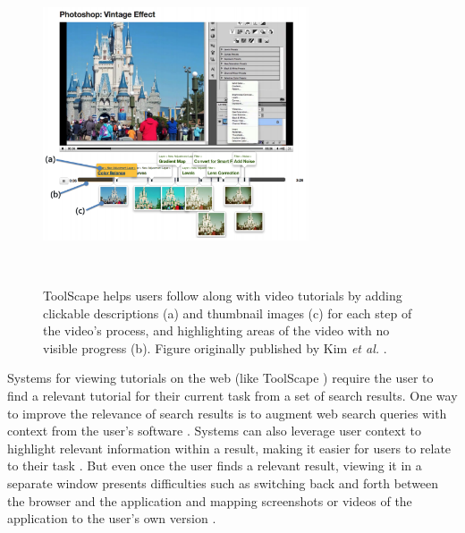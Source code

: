 \begin{figure}[t!]
\centering
  \includegraphics[width=0.7\textwidth]{figures/toolscape.png}
  \caption{ToolScape helps users follow along with video tutorials by adding clickable descriptions (a) and thumbnail images (c) for each step of the video’s process, and highlighting areas of the video with no visible progress (b). Figure originally published by Kim \textit{et al.} \cite{Kim2014}.}~\label{fig:intro_toolscape}
\end{figure}

Systems for viewing tutorials on the web (like ToolScape \cite{Kim2014, Kim2013}) require the user to find a relevant tutorial for their current task from a set of search results. One way to improve the relevance of search results is to augment web search queries with context from the user's software \cite{Ekstrand2011, Brandt2010, Matejka2011a}. Systems can also leverage user context to highlight relevant information within a result, making it easier for users to relate to their task \cite{Ekstrand2011, Fourney2014Intertwine}. But even once the user finds a relevant result, viewing it in a separate window presents difficulties such as switching back and forth between the browser and the application and mapping screenshots or videos of the application to the user's own version \cite{Kelleher2005, Pongnumkul2011}. 

